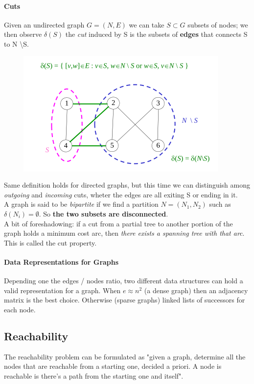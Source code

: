 \documentclass{article}
\begin{document}
			\paragraph{Cuts}
				Given an undirected graph $G = (N, E)$ we can take $S \subset G$ subsets of nodes; we then observe $\delta(S)$ the \textit{cut} induced by S is the subsets of \textbf{edges} that connects S to N \textbackslash S.
				\begin{figure}[H]
					\centering
					\includegraphics[width = \textwidth]{./images/Cut.png}
				\end{figure}
				Same definition holds for directed graphs, but this time we can distinguish among \textit{outgoing} and \textit{incoming} cuts, wheter the edges are all exiting S or ending in it.\\
				A graph is said to be \textit{bipartite} if we find a partition $N = (N_1, N_2)$ such as $\delta(N_i) = \emptyset$. So \textbf{the two subsets are disconnected}.\\
				A bit of foreshadowing: if a cut from a partial tree to another portion of the graph holds a minimum cost arc, then \textit{there exists a spanning tree with that arc}. This is called the cut property.
				
			\paragraph{Data Representations for Graphs}
			Depending one the edges / nodes ratio, two different data structures can hold a valid representation for a graph. When $e \approx n^2$ (a dense graph) then an adjacency matrix is the best choice. Otherwise (sparse graphs) linked lists of successors for each node.  

		\subsection{Reachability}
			The reachability problem can be formulated as "given a graph, determine all the nodes that are reachable from a starting one, decided a priori. A node is reachable is there's a path from the starting one and itself".
\end{document}
